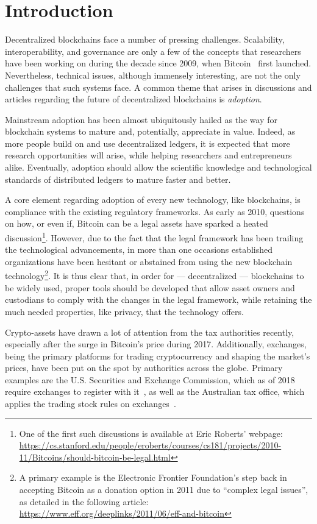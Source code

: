 \section{Introduction}\label{sec:introduction}

Decentralized blockchains face a number of pressing challenges.
Scalability, interoperability, and governance are only a few of the concepts
that researchers have been working on during the decade since 2009, when
Bitcoin~\cite{nakamoto2008bitcoin} first launched. Nevertheless, technical
issues, although immensely interesting, are not the only challenges that such
systems face. A common theme that arises in discussions and articles regarding
the future of decentralized blockchains is \emph{adoption}.

Mainstream adoption has been almost ubiquitously hailed as the way for
blockchain systems to mature and, potentially, appreciate in value. Indeed, as
more people build on and use decentralized ledgers, it is expected that more
research opportunities will arise, while helping researchers and entrepreneurs
alike. Eventually, adoption should allow the scientific knowledge and
technological standards of distributed ledgers to mature faster and better.

A core element regarding adoption of every new technology, like blockchains, is
compliance with the existing regulatory frameworks. As early as 2010, questions
on how, or even if, Bitcoin can be a legal assets have sparked a heated
discussion\footnote{One of the first such discussions is available at Eric
Roberts' webpage:
\url{https://cs.stanford.edu/people/eroberts/courses/cs181/projects/2010-11/Bitcoins/should-bitcoin-be-legal.html}}.
However, due to the fact that the legal framework has been trailing the
technological advancements, in more than one occasions established
organizations have been hesitant or abstained from using the new blockchain
technology\footnote{A primary example is the Electronic Frontier Foundation's
step back in accepting Bitcoin as a donation option in 2011 due to ``complex
legal issues'', as detailed in the following article:
\url{https://www.eff.org/deeplinks/2011/06/eff-and-bitcoin}}. It is thus clear
that, in order for --- decentralized --- blockchains to be widely used, proper
tools should be developed that allow asset owners and custodians to comply with
the changes in the legal framework, while retaining the much needed properties,
like privacy, that the technology offers.

Crypto-assets have drawn a lot of attention from the tax authorities recently,
especially after the surge in Bitcoin's price during 2017. Additionally,
exchanges, being the primary platforms for trading cryptocurrency and shaping
the market's prices, have been put on the spot by authorities across the
globe. Primary examples are the U.S. Securities and Exchange Commission, which
as of 2018 require exchanges to register with
it~\cite{securities2018statement}, as well as the Australian tax office, which
applies the trading stock rules on exchanges~\cite{tax2019statement}.


